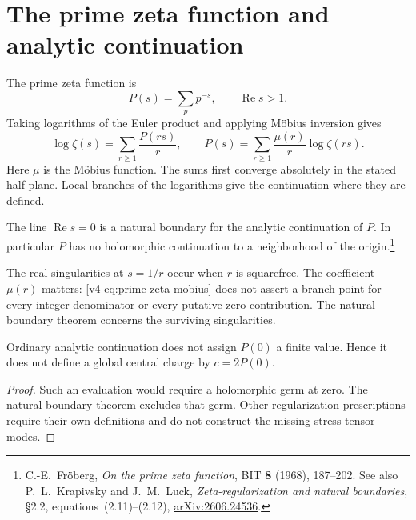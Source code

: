 \section{The prime zeta function and analytic continuation}
\label{v4-arith:pol:prime-zeta-obstruction}

The prime zeta function is
\[
                      P(s)=\sum_p p^{-s},\qquad\operatorname{Re}s>1.
\]
Taking logarithms of the Euler product and applying Möbius
inversion gives
\begin{equation}\label{v4-eq:prime-zeta-mobius}
 \log\zeta(s)=\sum_{r\geq1}\frac{P(rs)}r,
 \qquad
 P(s)=\sum_{r\geq1}\frac{\mu(r)}r\log\zeta(rs).
\end{equation}
Here \(\mu\) is the Möbius function. The sums first converge
absolutely in the stated half-plane. Local branches of the
logarithms give the continuation where they are defined.

\begin{theorem}
\label{v4-arith:thm:prime-zeta-natural-boundary}
The line \(\operatorname{Re}s=0\) is a natural boundary
for the analytic continuation of \(P\).
In particular \(P\) has no holomorphic continuation to a
neighborhood of the origin.\footnote{C.-E.~Fr\"oberg,
\emph{On the prime zeta function}, BIT \textbf{8} (1968),
187--202. See also P.~L.~Krapivsky and J.~M.~Luck,
\emph{Zeta-regularization and natural boundaries},
\S2.2, equations~(2.11)--(2.12),
\href{https://arxiv.org/abs/2606.24536}{arXiv:2606.24536}.}
\end{theorem}

The real singularities at \(s=1/r\) occur when \(r\) is
squarefree. The coefficient \(\mu(r)\) matters:
\eqref{v4-eq:prime-zeta-mobius} does not assert a branch point
for every integer denominator or every putative zero contribution.
The natural-boundary theorem concerns the surviving singularities.

\begin{corollary}\label{v4-arith:cor:zeta-P-0-undefined}
Ordinary analytic continuation does not assign \(P(0)\)
a finite value. Hence it does not define a global central
charge by \(c=2P(0)\).
\end{corollary}

\begin{proof}
Such an evaluation would require a holomorphic germ at zero.
The natural-boundary theorem excludes that germ.
Other regularization prescriptions require their own definitions
and do not construct the missing stress-tensor modes.
\end{proof}

